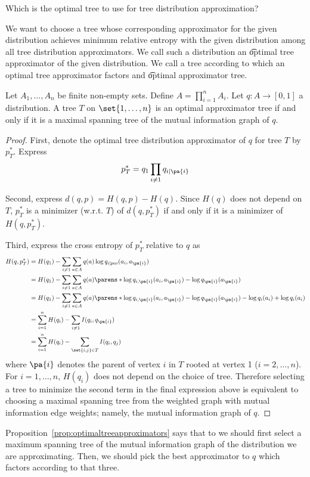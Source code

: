 
Which is the optimal tree to use for tree distribution approximation?


We want to choose a tree whose corresponding approximator for the given distribution achieves minimum relative entropy with the given distribution among all tree distribution approximators.
We call such a distribution an \t{optimal} tree approximator of the given distribution.
We call a tree according to which an optimal tree approximator factors and \t{optimal} approximator tree.


\begin{prop}

Let $A_1, \dots, A_n$ be finite non-empty sets.
Define $A = \prod_{i = 1}^{n} A_i$.
Let $q: A \to [0, 1]$ a distribution.
A tree $T$ on $\set{1, \dots, n}$ is an optimal approximator tree if and only if it is a maximal spanning tree of the mutual information graph of $q$.

\begin{proof}

First, denote the optimal tree distribution approximator of $q$ for tree $T$ by $p^*_T$.
Express
$$
  p^*_T = q_1 \prod_{i \neq 1} q_{i \mid \pa{i}}
$$

Second, express $d(q, p) = H(q, p) - H(q)$.
Since $H(q)$ does not depend on $T$, $p^*_T$ is a minimizer (w.r.t. $T$) of $d(q, p^*_T)$ if and only if it is a minimizer of $H(q, p^*_T)$.

Third, express the cross entropy of $p^*_T$ relative to $q$ as
$$
\begin{aligned}
  H(q, p^*_T) &= H(q_1) - \sum_{i \neq 1} \sum_{a \in A} q(a)\log q_{i \mid pa{i}}(a_i, a_{\pa{i}}) \\
              &= H(q_1) - \sum_{i \neq 1} \sum_{a \in A} q(a)\parens*{\log q_{i,\pa{i}}(a_i, a_{\pa{i}}) - \log q_{\pa{i}}(a_{\pa{i}})} \\
              &= H(q_1) - \sum_{i \neq 1} \sum_{a \in A} q(a)\parens*{\log q_{i,\pa{i}}(a_i, a_{\pa{i}}) - \log q_{\pa{i}}(a_{\pa{i}}) - \log q_i(a_i)  + \log q_{i}(a_i)} \\
              &= \sum_{i = 1}^{n} H(q_i) - \sum_{i \neq 1} I(q_i, q_{\pa{i}}) \\
              &= \sum_{i = 1}^{n} H(q_i) - \sum_{\set{i,j} \in T} I(q_i, q_{j}) \\
\end{aligned}
$$
where $\pa{i}$ denotes the parent of vertex $i$ in $T$ rooted at vertex 1 ($i = 2, \dots, n$).
For $i = 1, \dots, n$, $H(q_i)$ does not depend on the choice of tree.
Therefore selecting a tree to minimize the second term in the final expression above is equivalent to choosing a maximal spanning tree from the weighted graph with mutual information edge weights; namely, the mutual information graph of $q$.

\end{proof}

\label{prop:optimaltreeapproximators}
\end{prop}

Proposition~\ref{prop:optimaltreeapproximators} says that to we should first select a maximum spanning tree of the mutual information graph of the distribution we are approximating.
Then, we should pick the best approximator to $q$ which factors according to that three.
\strats
